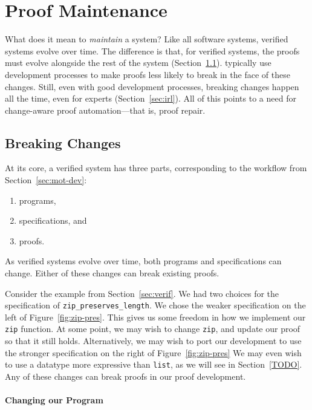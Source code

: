 \section{Proof Maintenance}
\label{sec:mot-mai}

What does it mean to \textit{maintain} a  system?
Like all software systems, verified systems evolve over time.
The difference is that, for verified systems, the proofs must evolve alongside the rest of the system (Section~\ref{sec:changes}).
 typically use development processes to make proofs less likely to break in the face of these changes.
Still, even with good development processes, breaking changes happen all the time, even for experts (Section~\ref{sec:irl}).
All of this points to a need for change-aware proof automation---that is, proof repair.

\subsection{Breaking Changes}
\label{sec:changes}

At its core, a verified system has three parts, corresponding to the workflow from Section~\ref{sec:mot-dev}:

\begin{enumerate}
\item programs,
\item specifications, and
\item proofs.
\end{enumerate}
As verified systems evolve over time, both programs and specifications can change.
Either of these changes can break existing proofs.

Consider the example from Section~\ref{sec:verif}.
We had two choices for the specification of \lstinline{zip_preserves_length}.
We chose the weaker specification on the left of Figure~\ref{fig:zip-pres}.
This gives us some freedom in how we implement our \lstinline{zip} function.
At some point, we may wish to change \lstinline{zip}, and update our proof so that it still holds.
Alternatively, we may wish to port our development to use the stronger specification on the right of Figure~\ref{fig:zip-pres}
We may even wish to use a datatype more expressive than \lstinline{list}, as we will see in Section~\ref{TODO}. %
Any of these changes can break proofs in our proof development.

\paragraph{Changing our Program}

